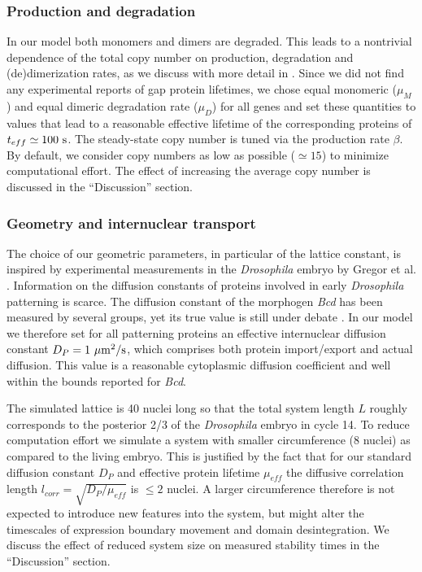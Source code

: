 \documentclass[a4paper,10pt]{article}
\newcommand{\Drosophila}{{\it Drosophila}\xspace}
\newcommand{\Bcd}{{\it Bcd}\xspace}
\newcommand{\unit}[1]{{\rm #1}}
\newcommand{\mumsps}{\unit{\mu m^2/s}}
\begin{document}
\subsubsection*{Production and degradation}
In our model both monomers and dimers are degraded.
This leads to a nontrivial dependence of the total copy number on production, degradation and (de)dimerization rates,
as we discuss with more detail in \cite{Sokolowski2012}.
Since we did not find any experimental reports of gap protein lifetimes, we chose equal monomeric ($\mu_M$) and equal dimeric degradation rate ($\mu_D$) 
for all genes and set these quantities to values that lead to a reasonable effective lifetime of the corresponding proteins of $t_{eff} \simeq 100~\unit{s}$.
The steady-state copy number is tuned via the production rate $\beta$.
By default, we consider copy numbers as low as possible ($\simeq 15$) to minimize computational effort.
The effect of increasing the average copy number is discussed in the ``Discussion'' section.

\subsubsection*{Geometry and internuclear transport}
The choice of our geometric parameters, in particular of the lattice constant, is inspired by experimental measurements
in the \Drosophila embryo by Gregor et al. \cite{Gregor2007a}.
Information on the diffusion constants of proteins involved in early \Drosophila patterning is scarce.
The diffusion constant of the morphogen \Bcd has been measured by several groups, 
yet its true value is still under debate \cite{Gregor2007b, Abu-Arish2010}.
In our model we therefore set for all patterning proteins an effective internuclear diffusion constant $D_P=1~\unit{\mumsps}$,
which comprises both protein import/export and actual diffusion.
This value is a reasonable cytoplasmic diffusion coefficient and well within the bounds reported for \Bcd.

The simulated lattice is 40 nuclei long so that the total system length $L$ roughly corresponds
to the posterior 2/3 of the \Drosophila embryo in cycle 14.
To reduce computation effort we simulate a system with smaller circumference (8 nuclei) as compared to the living embryo.
This is justified by the fact that for our standard diffusion constant $D_P$ and effective protein lifetime $\mu_{eff}$ 
the diffusive correlation length $l_{corr}=\sqrt{D_P/\mu_{eff}}$ is $\leq 2$ nuclei.
A larger circumference therefore is not expected to introduce new features into the system,
but might alter the timescales of expression boundary movement and domain desintegration.
We discuss the effect of reduced system size on measured stability times in the ``Discussion'' section.
\end{document}
